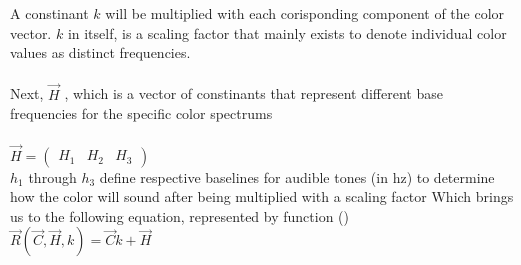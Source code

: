 \documentclass[]{article}
\begin{document}
A constinant \begin{math} k \end{math} will be multiplied with each corisponding component of the color vector. 
\begin{math} k \end{math} in itself, is a scaling factor that mainly exists to denote individual color
values as distinct frequencies. 
\\\\
Next, \begin{math}  \overrightarrow{H} \end{math} , which is a vector of constinants that represent different base frequencies for the specific color spectrums
\\\\
\begin{math} 
    \overrightarrow{H} = \begin{pmatrix}
            H_1 & H_2 & H_3
        \end{pmatrix}
\end{math}\\
\begin{math} h_1 \end{math} through \begin{math}h_3 \end{math} define respective baselines for audible tones  (in hz) to determine how the color will sound after being
multiplied with a scaling factor
Which brings us to the following equation, represented by function ()
\\
\begin{math}
    \overrightarrow{R}(\overrightarrow{C},\overrightarrow{H},k) = \overrightarrow{C}k + \overrightarrow{H}
\end{math}
\\\\
\end{document}
